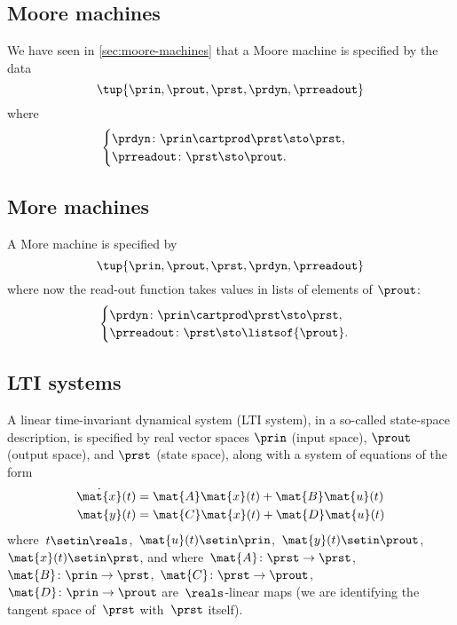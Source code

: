 \subsection{Moore machines}

We have seen in \cref{sec:moore-machines}  that a Moore machine is specified by the data
\begin{equation}
    \tup{\prin, \prout, \prst, \prdyn, \prreadout}
\end{equation}
where
\begin{equation}\label{eq:moore-specification-again}
    \begin{cases}
        \prdyn \colon \prin \cartprod \prst \sto \prst, \\
        \prreadout \colon \prst \sto \prout.
    \end{cases}
\end{equation}

\subsection{More machines}

A More machine is specified by
\begin{equation}
    \tup{\prin, \prout, \prst, \prdyn, \prreadout}
\end{equation}
where now the read-out function takes values in lists of elements of $\prout$:
\begin{equation}\label{eq:more-specification-again}
    \begin{cases}
        \prdyn \colon \prin \cartprod \prst \sto \prst, \\
        \prreadout \colon \prst \sto \listsof{\prout}.
    \end{cases}
\end{equation}

\subsection{LTI systems}

A linear time-invariant dynamical system (LTI system), in a so-called state-space description, is specified by real vector spaces $\prin$ (input space), $\prout$ (output space), and $\prst$ (state space), along with a system of equations of the form
\begin{align}
    \dot{\mat{x}}(t) & = \mat{A}\mat{x}(t) + \mat{B}\mat{u}(t) \label{eq:LTI-system-dyn} \\
    \mat{y}(t)       & = \mat{C}\mat{x}(t) + \mat{D}\mat{u}(t) \label{eq:LTI-system-ro}
\end{align}
where~$t \setin \reals$,~$\mat{u}(t) \setin \prin$,~$\mat{y}(t) \setin \prout$,~$\mat{x}(t) \setin \prst$, and where~$\mat{A}\colon \prst \to \prst$,~$\mat{B}\colon \prin \to \prst$,~$\mat{C}\colon \prst \to \prout$,~$\mat{D}\colon \prin \to \prout$ are~$\reals$-linear maps (we are identifying the tangent space of~$\prst$ with~$\prst$ itself).

